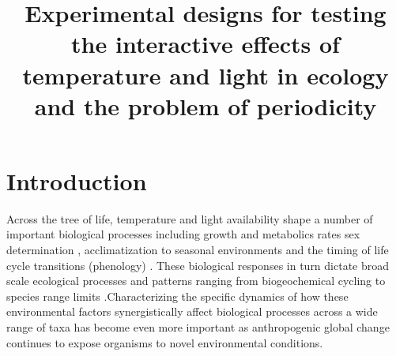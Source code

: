 \documentclass[11pt]{article}
\title{Experimental designs for testing the interactive effects of temperature and light in ecology and the problem of periodicity }
\begin{document}
\maketitle
\section{Introduction}
\noindent Across the tree of life, temperature and light availability shape a number of important biological processes including growth and metabolics rates \citep{MacLean:2019aa} sex determination \citep{Brown:2014vn}, acclimatization to seasonal environments \citep{Hamilton2016} and the timing of life cycle transitions (phenology) \citep{Forrest2010}. These biological responses in turn dictate broad scale ecological processes and patterns ranging from biogeochemical cycling \citep{Piao2007} to species range limits \citep{Chuine2001}.Characterizing the specific dynamics of how these environmental factors synergistically affect biological processes across a wide range of taxa has become even more important as anthropogenic global change continues to expose organisms to novel environmental conditions.

\end{document}

